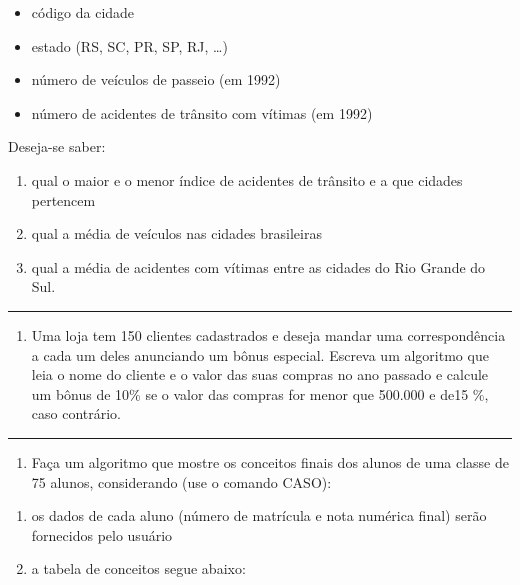 \documentclass[12pt,a4paper]{article}
\providecommand{\tightlist}{%
      \setlength{\itemsep}{0pt}\setlength{\parskip}{0pt}}
\begin{document}
\begin{itemize}
\item
  código da cidade
\item
  estado (RS, SC, PR, SP, RJ, \ldots)
\item
  número de veículos de passeio (em 1992)
\item
  número de acidentes de trânsito com vítimas (em 1992)
\end{itemize}

Deseja-se saber:

\begin{enumerate}
\def\labelenumi{\alph{enumi})}
\item
  qual o maior e o menor índice de acidentes de trânsito e a que cidades
  pertencem
\item
  qual a média de veículos nas cidades brasileiras
\item
  qual a média de acidentes com vítimas entre as cidades do Rio Grande
  do Sul.
\end{enumerate}

    \begin{center}\rule{0.5\linewidth}{0.5pt}\end{center}

\begin{enumerate}
\def\labelenumi{\arabic{enumi}.}
\setcounter{enumi}{12}
\tightlist
\item
  Uma loja tem 150 clientes cadastrados e deseja mandar uma
  correspondência a cada um deles anunciando um bônus especial. Escreva
  um algoritmo que leia o nome do cliente e o valor das suas compras no
  ano passado e calcule um bônus de 10\% se o valor das compras for
  menor que 500.000 e de15 \%, caso contrário.
\end{enumerate}

    \begin{center}\rule{0.5\linewidth}{0.5pt}\end{center}

\begin{enumerate}
\def\labelenumi{\arabic{enumi}.}
\setcounter{enumi}{13}
\tightlist
\item
  Faça um algoritmo que mostre os conceitos finais dos alunos de uma
  classe de 75 alunos, considerando (use o comando CASO):
\end{enumerate}

\begin{enumerate}
\def\labelenumi{\alph{enumi})}
\item
  os dados de cada aluno (número de matrícula e nota numérica final)
  serão fornecidos pelo usuário
\item
  a tabela de conceitos segue abaixo:
\end{enumerate}
\end{document}
